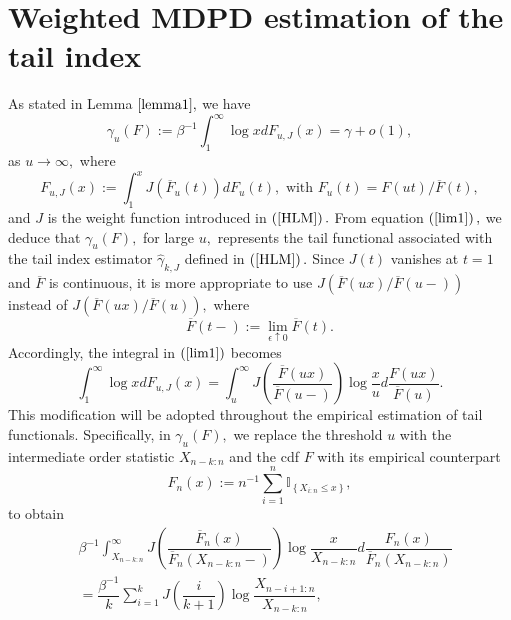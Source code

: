 \documentclass[12pt,reqno,openbib,runningheads,a4paper,portrait]{amsart}%
\begin{document}
\section{\textbf{Weighted MDPD estimation of the tail index\label{sec3}}}

\noindent As stated in Lemma $\ref{lemma1},$ we have%
\begin{equation}
\gamma_{u}\left(  F\right)  :=\beta^{-1}\int_{1}^{\infty}\log xdF_{u,J}\left(
x\right)  =\gamma+o\left(  1\right)  , \label{lim1}%
\end{equation}
as $u\rightarrow\infty,$ where%
\[
F_{u,J}\left(  x\right)  :=\int_{1}^{x}J\left(  \overline{F}_{u}\left(
t\right)  \right)  dF_{u}\left(  t\right)  ,\text{ with }F_{u}\left(
t\right)  =F\left(  ut\right)  /\overline{F}\left(  t\right)  ,
\]
and $J$ is the weight function introduced in $\left(  \ref{HLM}\right)  .$
From equation $\left(  \ref{lim1}\right)  ,$ we deduce that $\gamma_{u}\left(
F\right)  ,$ for large $u,$ represents the tail functional associated with the
tail index estimator $\widehat{\gamma}_{k,J}$ defined in $\left(
\ref{HLM}\right)  .$ Since $J\left(  t\right)  $ vanishes at $t=1$ and
$\overline{F}$ is continuous, it is more appropriate to use $J\left(
\overline{F}\left(  ux\right)  /\overline{F}\left(  u-\right)  \right)  $
instead of $J\left(  \overline{F}\left(  ux\right)  /\overline{F}\left(
u\right)  \right)  ,$ where
\[
\overline{F}\left(  t-\right)  :=\lim_{\epsilon\uparrow0}\overline{F}\left(
t\right)  .
\]
Accordingly, the integral in $\left(  \ref{lim1}\right)  $ becomes
\[
\int_{1}^{\infty}\log xdF_{u,J}\left(  x\right)  =\int_{u}^{\infty}J\left(
\dfrac{\overline{F}\left(  ux\right)  }{\overline{F}\left(  u-\right)
}\right)  \log\dfrac{x}{u}d\dfrac{F\left(  ux\right)  }{\overline{F}\left(
u\right)  }.
\]
This modification will be adopted throughout the empirical estimation of tail
functionals. Specifically, in $\gamma_{u}\left(  F\right)  ,$ we replace the
threshold $u$ with the intermediate order statistic $X_{n-k:n}$ and the cdf
$F$ with its empirical counterpart
\[
F_{n}\left(  x\right)  :=n^{-1}\sum_{i=1}^{n}\mathbb{I}_{\left\{  X_{i:n}\leq
x\right\}  },
\]
to obtain%
\begin{align*}
&  \beta^{-1}\int_{X_{n-k:n}}^{\infty}J\left(  \dfrac{\overline{F}_{n}\left(
x\right)  }{\overline{F}_{n}\left(  X_{n-k:n}-\right)  }\right)  \log\dfrac
{x}{X_{n-k:n}}d\dfrac{F_{n}\left(  x\right)  }{\overline{F}_{n}\left(
X_{n-k:n}\right)  }\\
&  =\dfrac{\beta^{-1}}{k}%
{\displaystyle\sum\limits_{i=1}^{k}}
J\left(  \dfrac{i}{k+1}\right)  \log\dfrac{X_{n-i+1:n}}{X_{n-k:n}},
\end{align*}
\end{document}
